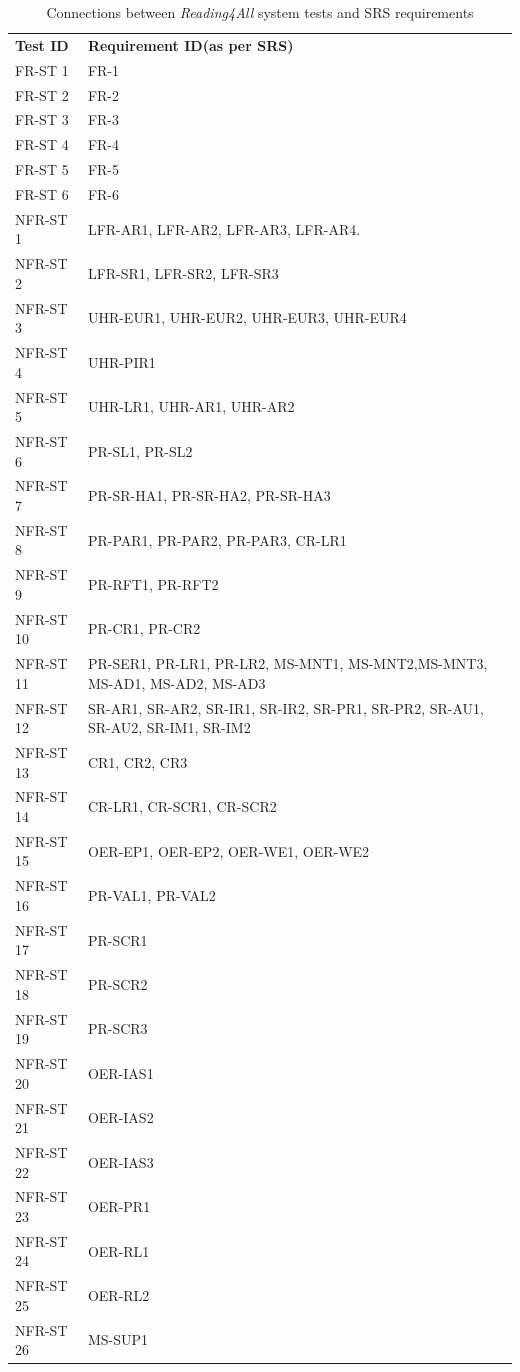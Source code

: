 \documentclass[12pt, titlepage]{article}
\begin{document}
\begin{longtable}{|p{6.0cm}|p{8.0cm}|}
  \captionsetup{justification=raggedright,singlelinecheck=false}
  \caption{Connections between \textit{Reading4All} system tests and
  SRS requirements}
  \label{tab:sys-tests} \\
  \toprule
  {\textbf{Test ID}} & {\textbf{Requirement ID(as per SRS)}}\\
  \midrule
  FR-ST 1 & FR-1 \\ \hline
  FR-ST 2 & FR-2 \\ \hline
  FR-ST 3 & FR-3 \\ \hline
  FR-ST 4 & FR-4 \\ \hline
  FR-ST 5 & FR-5 \\ \hline
  FR-ST 6 & FR-6 \\ \hline
  NFR-ST 1 & LFR-AR1, LFR-AR2, LFR-AR3, LFR-AR4. \\ \hline
  NFR-ST 2 & LFR-SR1, LFR-SR2, LFR-SR3 \\ \hline
  NFR-ST 3 & UHR-EUR1, UHR-EUR2, UHR-EUR3, UHR-EUR4 \\ \hline
  NFR-ST 4 & UHR-PIR1 \\ \hline
  NFR-ST 5 & UHR-LR1, UHR-AR1, UHR-AR2\\ \hline
  NFR-ST 6 & PR-SL1, PR-SL2\\ \hline
  NFR-ST 7 & PR-SR-HA1, PR-SR-HA2, PR-SR-HA3 \\ \hline
  NFR-ST 8 & PR-PAR1, PR-PAR2, PR-PAR3, CR-LR1 \\ \hline
  NFR-ST 9 & PR-RFT1, PR-RFT2 \\ \hline
  NFR-ST 10 & PR-CR1, PR-CR2 \\ \hline
  NFR-ST 11 & PR-SER1, PR-LR1, PR-LR2, MS-MNT1, MS-MNT2,MS-MNT3, MS-AD1, MS-AD2, MS-AD3 \\ \hline
  NFR-ST 12 & SR-AR1, SR-AR2, SR-IR1, SR-IR2, SR-PR1, SR-PR2, SR-AU1, SR-AU2, SR-IM1, SR-IM2 \\ \hline
  NFR-ST 13 & CR1, CR2, CR3 \\ \hline
  NFR-ST 14 & CR-LR1, CR-SCR1, CR-SCR2 \\ \hline
  NFR-ST 15 & OER-EP1, OER-EP2, OER-WE1, OER-WE2 \\ \hline
  NFR-ST 16 & PR-VAL1, PR-VAL2 \\ \hline
  NFR-ST 17 & PR-SCR1 \\ \hline
  NFR-ST 18 & PR-SCR2 \\ \hline
  NFR-ST 19 & PR-SCR3 \\ \hline
  NFR-ST 20 & OER-IAS1 \\ \hline
  NFR-ST 21 & OER-IAS2 \\ \hline
  NFR-ST 22 & OER-IAS3 \\ \hline
  NFR-ST 23 & OER-PR1 \\ \hline
  NFR-ST 24 & OER-RL1 \\ \hline
  NFR-ST 25 & OER-RL2 \\ \hline
  NFR-ST 26 & MS-SUP1 \\
  \bottomrule
\end{longtable}
\end{document}
